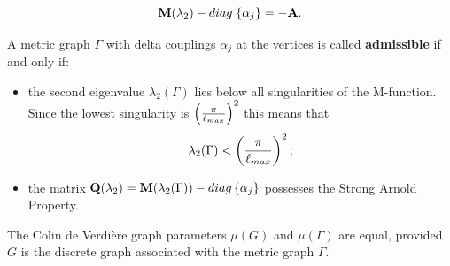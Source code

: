 \documentclass[10pt,a4paper]{amsart}
\begin{document}
 \begin{equation} \label{eq2}
\mathbf M (\lambda_2) - {\rm diag}\; \{ \alpha_j \} = - \mathbf A.
\end{equation}

\begin{definition}
A metric graph $ \Gamma $ with delta couplings $ \alpha_j $ at the vertices is called
{\bf admissible} if and only if:
\begin{itemize}
\item the second eigenvalue $ \lambda_2 (\Gamma) $ lies below all singularities 
of the M-function. Since the lowest singularity is $\left( \frac{\pi}{\ell_{\rm max}} \right)^2$ this means that
\begin{equation} \label{eq9}
\lambda_2 (\Gamma) <  \left( \frac{\pi}{\ell_{\rm max}} \right)^2; 
\end{equation}
\item the matrix $ \mathbf Q(\lambda_2) = \mathbf M (\lambda_2 (\Gamma)) - {\rm diag}\, \{\alpha_j \} $
possesses the Strong Arnold Property.
\end{itemize}
\end{definition}

\begin{theorem}  \label{ThST} The Colin de Verdi{\`e}re graph parameters $\mu(G)$ and $ \mu (\Gamma) $ are equal, 
provided $ G $ is the discrete graph associated with the metric graph $ \Gamma$.
\end{theorem}
\end{document}
